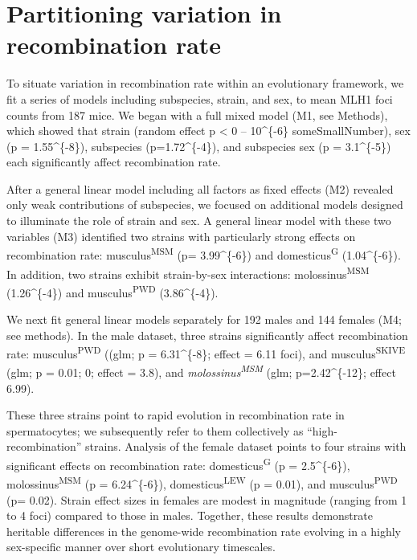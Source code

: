 \documentclass[]{article}
\begin{document}
\section{Partitioning variation in recombination
rate}\label{partitioning-variation-in-recombination-rate}

To situate variation in recombination rate within an evolutionary
framework, we fit a series of models including subspecies, strain, and
sex, to mean MLH1 foci counts from 187 mice. We began with a full mixed
model (M1, see Methods), which showed that strain (random effect p
\textless{} 0 -- 10\^{}\{-6\} someSmallNumber), sex (p =
1.55\^{}\{-8\}), subspecies (p=1.72\^{}\{-4\}), and
subspecies sex (p = 3.1\^{}\{-5\}) each significantly affect
recombination rate.

After a general linear model including all factors as fixed effects (M2)
revealed only weak contributions of subspecies, we focused on additional
models designed to illuminate the role of strain and sex. A general
linear model with these two variables (M3) identified two strains with
particularly strong effects on recombination rate:
musculus\textsuperscript{MSM} (p= 3.99\^{}\{-6\}) and
domesticus\textsuperscript{G} (1.04\^{}\{-6\}). In addition,
two strains exhibit strain-by-sex interactions:
molossinus\textsuperscript{MSM} (1.26\^{}\{-4\}) and
musculus\textsuperscript{PWD} (3.86\^{}\{-4\}).

We next fit general linear models separately for 192 males and 144
females (M4; see methods). In the male dataset, three strains
significantly affect recombination rate: musculus\textsuperscript{PWD}
((glm; p = 6.31\^{}\{-8\}; effect = 6.11 foci), and
musculus\textsuperscript{SKIVE} (glm; p = 0.01; 0; effect = 3.8), and
\emph{molossinus\textsuperscript{MSM}} (glm; p=2.42\^{}\{-12\};
effect 6.99).

These three strains point to rapid evolution in recombination rate in
spermatocytes; we subsequently refer to them collectively as
``high-recombination'' strains. Analysis of the female dataset points to
four strains with significant effects on recombination rate:
domesticus\textsuperscript{G} (p = 2.5\^{}\{-6\}),
molossinus\textsuperscript{MSM} (p = 6.24\^{}\{-6\}),
domesticus\textsuperscript{LEW} (p = 0.01), and
musculus\textsuperscript{PWD} (p= 0.02). Strain effect sizes in females
are modest in magnitude (ranging from 1 to 4 foci) compared to those in
males. Together, these results demonstrate heritable differences in the
genome-wide recombination rate evolving in a highly sex-specific manner
over short evolutionary timescales.
\end{document}
